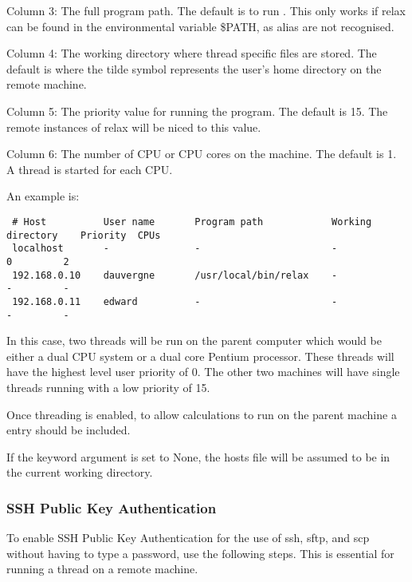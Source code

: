  Column 3:  The full program path.  The default is to run .  This only works if relax can be found in the environmental variable \$PATH, as alias are not recognised. 
  

 Column 4:  The working directory where thread specific files are stored.  The default is  where the tilde \quotecmd{\~{}} symbol represents the user's home directory on the remote machine. 
  

 Column 5:  The priority value for running the program.  The default is 15.  The remote instances of relax will be niced to this value. 
  

 Column 6:  The number of CPU or CPU cores on the machine.  The default is 1.  A thread is started for each CPU. 
  

 An example is: 
  

 {\footnotesize \begin{verbatim} 
 # Host          User name       Program path            Working directory    Priority  CPUs 
 localhost       -               -                       -                    0         2 
 192.168.0.10    dauvergne       /usr/local/bin/relax    -                    -         - 
 192.168.0.11    edward          -                       -                    -         - 
 \end{verbatim}} 

 In this case, two threads will be run on the parent computer which would be either a dual CPU system or a dual core  Pentium processor.  These threads will have the highest level user priority of 0.  The other two machines will have single threads running with a low priority of 15. 
  

 Once threading is enabled, to allow calculations to run on the parent machine a  entry should be included. 
  

 If the keyword argument  is set to None, the hosts file will be assumed to be in the current working directory. 
  

  
 \subsubsection{SSH Public Key Authentication} 

 To enable SSH Public Key Authentication for the use of ssh, sftp, and scp without having to type a password, use the following steps.  This is essential for running a thread on a remote machine. 
  

